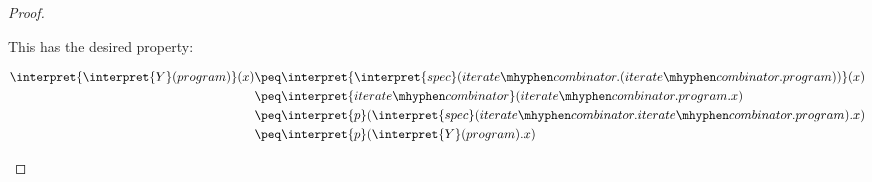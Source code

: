 \begin{proof}
\begin{enumerate}
			This has the desired property:

			\begin{equation*}
				\begin{split}
					\interpret{\interpret{Y}(program)}(x) 
					&\peq \interpret{\interpret{spec}(iterate\mhyphen
				combinator.(iterate\mhyphen combinator.program))}(x)\\
				&\peq \interpret{iterate\mhyphen combinator}(iterate\mhyphen combinator.program.x) \\
				&\peq \interpret{p}(\interpret{spec}(iterate\mhyphen combinator.iterate\mhyphen combinator.program).x)\\
				&\peq \interpret{p}(\interpret{Y}(program).x)
				\end{split}
			\end{equation*}
	\end{enumerate}
\end{proof}

